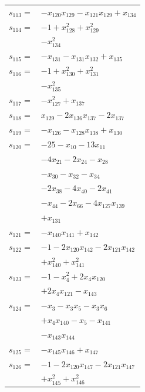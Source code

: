 \begin{longtable}{@{}r@{\;}l@{}}
\(s_{113}=\) & \(\displaystyle -x_{120}x_{129} -x_{121}x_{129} +x_{134}\) \\[3pt]
\(s_{114}=\) & \(\displaystyle -1 +x_{128}^{2} +x_{129}^{2}\) \\
 & \(\displaystyle -x_{134}^{2}\) \\[3pt]
\(s_{115}=\) & \(\displaystyle -x_{131} -x_{131}x_{132} +x_{135}\) \\[3pt]
\(s_{116}=\) & \(\displaystyle -1 +x_{130}^{2} +x_{131}^{2}\) \\
 & \(\displaystyle -x_{135}^{2}\) \\[3pt]
\(s_{117}=\) & \(\displaystyle -x_{127}^{2} +x_{137}\) \\[3pt]
\(s_{118}=\) & \(\displaystyle x_{129} -2x_{136}x_{137} -2x_{137}\) \\[3pt]
\(s_{119}=\) & \(\displaystyle -x_{126} -x_{128}x_{138} +x_{130}\) \\[3pt]
\(s_{120}=\) & \(\displaystyle -25 -x_{10} -13x_{11}\) \\
 & \(\displaystyle -4x_{21} -2x_{24} -x_{28}\) \\
 & \(\displaystyle -x_{30} -x_{32} -x_{34}\) \\
 & \(\displaystyle -2x_{38} -4x_{40} -2x_{41}\) \\
 & \(\displaystyle -x_{44} -2x_{66} -4x_{127}x_{139}\) \\
 & \(\displaystyle +x_{131}\) \\[3pt]
\(s_{121}=\) & \(\displaystyle -x_{140}x_{141} +x_{142}\) \\[3pt]
\(s_{122}=\) & \(\displaystyle -1 -2x_{120}x_{142} -2x_{121}x_{142}\) \\
 & \(\displaystyle +x_{140}^{2} +x_{141}^{2}\) \\[3pt]
\(s_{123}=\) & \(\displaystyle -1 -x_{4}^{2} +2x_{4}x_{120}\) \\
 & \(\displaystyle +2x_{4}x_{121} -x_{143}\) \\[3pt]
\(s_{124}=\) & \(\displaystyle -x_{3} -x_{3}x_{5} -x_{3}x_{6}\) \\
 & \(\displaystyle +x_{4}x_{140} -x_{5} -x_{141}\) \\
 & \(\displaystyle -x_{143}x_{144}\) \\[3pt]
\(s_{125}=\) & \(\displaystyle -x_{145}x_{146} +x_{147}\) \\[3pt]
\(s_{126}=\) & \(\displaystyle -1 -2x_{120}x_{147} -2x_{121}x_{147}\) \\
 & \(\displaystyle +x_{145}^{2} +x_{146}^{2}\) \\[3pt]

\end{longtable}
